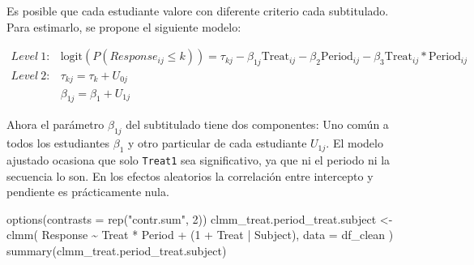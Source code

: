 \documentclass[
  12pt,
  a4paper,
  extrafontsizes,
  onecolumn,
  openright,
  table]{memoir}
\newenvironment{Shaded}{\begin{snugshade}}{\end{snugshade}}
\newcommand{\AttributeTok}[1]{\textcolor[rgb]{0.40,0.45,0.13}{#1}}
\newcommand{\DecValTok}[1]{\textcolor[rgb]{0.68,0.00,0.00}{#1}}
\newcommand{\FunctionTok}[1]{\textcolor[rgb]{0.28,0.35,0.67}{#1}}
\newcommand{\NormalTok}[1]{\textcolor[rgb]{0.00,0.23,0.31}{#1}}
\newcommand{\OtherTok}[1]{\textcolor[rgb]{0.00,0.23,0.31}{#1}}
\newcommand{\SpecialCharTok}[1]{\textcolor[rgb]{0.37,0.37,0.37}{#1}}
\newcommand{\StringTok}[1]{\textcolor[rgb]{0.13,0.47,0.30}{#1}}
\begin{document}
Es posible que cada estudiante valore con diferente criterio cada
subtitulado. Para estimarlo, se propone el siguiente modelo:

\small

\[
\begin{aligned}
Level\ 1: & \text{logit}(P(Response_{ij} \leq k)) = \tau_{kj} - \beta_{1j} \text{Treat}_{ij} - \beta_{2} \text{Period}_{ij} - \beta_{3} \text{Treat}_{ij} * \text{Period}_{ij} \\
Level\ 2: & \tau_{kj}  =  \tau_{k} + U_{0j} \\
          & \beta_{1j}  =  \beta_{1} + U_{1j}
\end{aligned}
\]

\normalsize

Ahora el parámetro \(\beta_{1j}\) del subtitulado tiene dos componentes:
Uno común a todos los estudiantes \(\beta_{1}\) y otro particular de
cada estudiante \(U_{1j}\). El modelo ajustado ocasiona que solo
\texttt{Treat1} sea significativo, ya que ni el periodo ni la secuencia
lo son. En los efectos aleatorios la correlación entre intercepto y
pendiente es prácticamente nula.

\scriptsize

\begin{Shaded}
\begin{Highlighting}[]
\FunctionTok{options}\NormalTok{(}\AttributeTok{contrasts =} \FunctionTok{rep}\NormalTok{(}\StringTok{"contr.sum"}\NormalTok{, }\DecValTok{2}\NormalTok{))}
\NormalTok{clmm\_treat.period\_treat.subject }\OtherTok{\textless{}{-}} \FunctionTok{clmm}\NormalTok{(}
\NormalTok{    Response }\SpecialCharTok{\textasciitilde{}}\NormalTok{ Treat }\SpecialCharTok{*}\NormalTok{ Period }\SpecialCharTok{+}\NormalTok{ (}\DecValTok{1} \SpecialCharTok{+}\NormalTok{ Treat }\SpecialCharTok{|}\NormalTok{ Subject),}
    \AttributeTok{data =}\NormalTok{ df\_clean}
\NormalTok{)}
\FunctionTok{summary}\NormalTok{(clmm\_treat.period\_treat.subject)}
\end{Highlighting}
\end{Shaded}
\end{document}
